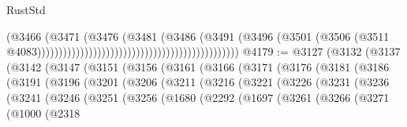 \begin{lexlean}{RustStd}
\begin{coremodule}
                                                                              (@3466
                                                                                (@3471
                                                                                  (@3476
                                                                                    (@3481
                                                                                      (@3486
                                                                                        (@3491
                                                                                          (@3496
                                                                                            (@3501
                                                                                              (@3506
                                                                                                (@3511
                                                                                                  @4083)))))))))))))))))))))))))))))))))))))))))))))))
@4179 := @3127
    (@3132
      (@3137
        (@3142
          (@3147
            (@3151
              (@3156
                (@3161
                  (@3166
                    (@3171
                      (@3176
                        (@3181
                          (@3186
                            (@3191
                              (@3196
                                (@3201
                                  (@3206
                                    (@3211
                                      (@3216
                                        (@3221
                                          (@3226
                                            (@3231
                                              (@3236
                                                (@3241
                                                  (@3246
                                                    (@3251
                                                      (@3256
                                                        (@1680
                                                          (@2292
                                                            (@1697
                                                              (@3261
                                                                (@3266
                                                                  (@3271
                                                                    (@1000
                                                                      (@2318

\end{coremodule}
\end{lexlean}
